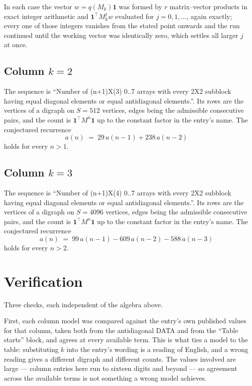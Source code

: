 \documentclass[11pt,a4paper]{article}
\theoremstyle{plain}
\theoremstyle{definition}
\begin{document}
In each case the vector $w=q(M_k)\mathbf{1}$ was formed by $r$ matrix--vector products in
exact integer arithmetic and $\mathbf{1}^{\!\top}M_k^{j}w$ evaluated for $j=0,1,\dots$,
again exactly; every one of those integers vanishes from the stated point onwards and the run
continued until the working vector was identically zero, which settles all larger $j$ at once.

\subsection*{Column $k=2$}
The sequence is ``Number of (n+1)X(3) 0..7 arrays with every 2X2 subblock having equal diagonal elements or equal antidiagonal elements.''. Its rows are the vertices of a digraph on
$S=512$ vertices, edges being the admissible consecutive pairs, and the count is
$\mathbf{1}^{\!\top}M^{n}\mathbf{1}$ up to the constant factor in the entry's name.
The conjectured recurrence
\[
a(n)\;=\;29\,a(n-1) + 238\,a(n-2)
\]
holds for every $n>1$.

\subsection*{Column $k=3$}
The sequence is ``Number of (n+1)X(4) 0..7 arrays with every 2X2 subblock having equal diagonal elements or equal antidiagonal elements.''. Its rows are the vertices of a digraph on
$S=4096$ vertices, edges being the admissible consecutive pairs, and the count is
$\mathbf{1}^{\!\top}M^{n}\mathbf{1}$ up to the constant factor in the entry's name.
The conjectured recurrence
\[
a(n)\;=\;99\,a(n-1) - 609\,a(n-2) - 588\,a(n-3)
\]
holds for every $n>2$.

\section{Verification}

Three checks, each independent of the algebra above.

First, each column model was compared against the entry's own published values for that
column, taken both from the antidiagonal DATA and from the ``Table starts'' block, and agrees
at every available term. This is what ties a model to the table: substituting $k$ into the
entry's wording is a reading of English, and a wrong reading gives a different digraph and
different counts. The values involved are large --- column entries here run to sixteen digits
and beyond --- so agreement across the available terms is not something a wrong model
achieves.
\end{document}

